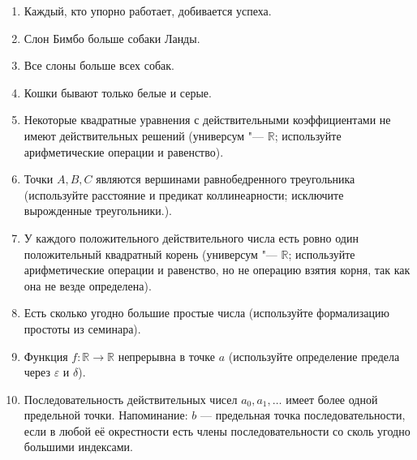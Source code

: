 \documentclass{article}
\newcommand{\itemhard}{\refstepcounter{enumi}\item[\theenumi$^\star$.]}
\begin{document}
\begin{enumerate}
    \item Каждый, кто упорно работает, добивается успеха.
    \item Слон Бимбо больше собаки Ланды.
    \item Все слоны больше всех собак.
    \item Кошки бывают только белые и серые.
    \item Некоторые квадратные уравнения с действительными коэффициентами не имеют действительных решений (универсум "--- $\mathbb{R}$; используйте арифметические операции и равенство).
    \item Точки $A, B, C$ являются вершинами равнобедренного треугольника (используйте расстояние и предикат коллинеарности; исключите вырожденные треугольники.).
    \item У каждого положительного действительного числа есть ровно один положительный квадратный корень (универсум "--- $\mathbb{R}$; используйте арифметические операции и равенство, но не операцию взятия корня, так как она не везде определена).
    \item Есть сколько угодно большие простые числа (используйте формализацию простоты из семинара).
    \item Функция $f: \mathbb{R} \to \mathbb{R}$ непрерывна в точке $a$ (используйте определение предела через $\varepsilon$ и $\delta$).
    \itemhard Последовательность действительных чисел $a_0, a_1, \ldots$ имеет более одной предельной точки. Напоминание: $b$ --- предельная точка последовательности, если в любой её окрестности есть члены последовательности со сколь угодно большими индексами.
\end{enumerate}
\end{document}
